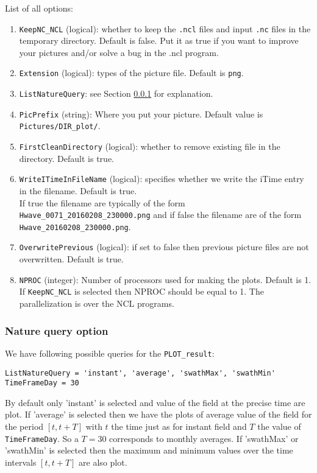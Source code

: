 \documentclass[12pt]{amsart}
\begin{document}
List of all options:
\begin{enumerate}
\item {\tt KeepNC\_NCL} (logical): whether to keep the {\tt .ncl} files and input {\tt .nc}
files in the temporary directory. Default is false. Put it as true if you want to improve
your pictures and/or solve a bug in the .ncl program.
\item {\tt Extension} (logical): types of the picture file. Default is {\tt png}.
\item {\tt ListNatureQuery}: see Section \ref{NatureQuery} for explanation.
\item {\tt PicPrefix} (string): Where you put your picture. Default value is {\tt Pictures/DIR\_plot/}.
\item {\tt FirstCleanDirectory} (logical): whether to remove existing file in the directory. Default is true.
\item {\tt WriteITimeInFileName} (logical): specifies whether we write the iTime entry in the filename. Default is true.\\
If true the filename are typically of the form {\tt Hwave\_0071\_20160208\_230000.png} and if false the filename are of the form {\tt Hwave\_20160208\_230000.png}.
\item {\tt OverwritePrevious} (logical): if set to false then previous picture files are not overwritten. Default is true.
\item {\tt NPROC} (integer): Number of processors used for making the plots. Default is 1. If {\tt KeepNC\_NCL} is selected then NPROC should be equal to 1. The parallelization is over the NCL programs.
\end{enumerate}










\subsubsection{Nature query option}\label{NatureQuery}
We have following possible queries for the {\tt PLOT\_result}:
\begin{verbatim}
ListNatureQuery = 'instant', 'average', 'swathMax', 'swathMin'
TimeFrameDay = 30
\end{verbatim}
By default only 'instant' is selected and value of the field at the precise time are plot.
If 'average' is selected then we have the plots of average value of the field for the period $[t, t+ T]$ with $t$ the time just as for instant field and $T$ the value of {\tt TimeFrameDay}. So a $T=30$ corresponds to monthly averages.
If 'swathMax' or 'swathMin' is selected then the maximum and minimum values over the time intervals $[t, t+T]$ are also plot.
\end{document}
